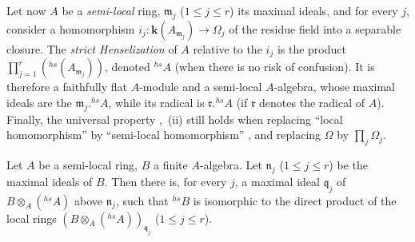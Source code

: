 \begin{env}[18.8.9]
\label{IV.18.8.9}
Let now $A$ be a \emph{semi-local} ring, $\mathfrak{m}_j$ ($1\leq j\leq r$) its maximal ideals, and for every $j$, consider a homomorphism $i_j:\boldsymbol{k}(A_{\mathfrak{m}_j})\to\Omega_j$ of the residue field into a separable closure.
The \emph{strict Henselization} of $A$ relative to the $i_j$ is the product $\prod_{j=1}^{r}({}^{hs}(A_{\mathfrak{m}_j}))$, denoted ${}^{hs}\!A$ (when there is no risk of confusion).
It is therefore a faithfully flat $A$-module and a semi-local $A$-algebra, whose maximal ideals are the $\mathfrak{m}_j.{}^{hs}\!A$, while its radical is $\mathfrak{r}.{}^{hs}\!A$ (if $\mathfrak{r}$ denotes the radical of $A$).
Finally, the universal property ,~(ii) still holds when replacing ``local homomorphism'' by ``semi-local homomorphism'' , and replacing $\Omega$ by $\prod_j\Omega_j$.
\end{env}

\begin{proposition}[18.8.10]
\label{IV.18.8.10}
Let $A$ be a semi-local ring, $B$ a finite $A$-algebra.
Let $\mathfrak{n}_j$ \textup{($1\leq j\leq r$)} be the maximal ideals of $B$.
Then there is, for every $j$, a maximal ideal $\mathfrak{q}_j$ of $B\otimes_{A}({}^{hs}\!A)$ above $\mathfrak{n}_j$, such that ${}^{hs}\!B$ is isomorphic to the direct product of the local rings $(B\otimes_{A}({}^{hs}\!A))_{\mathfrak{q}_j}$ \textup{($1\leq j\leq r$)}.
\end{proposition}

